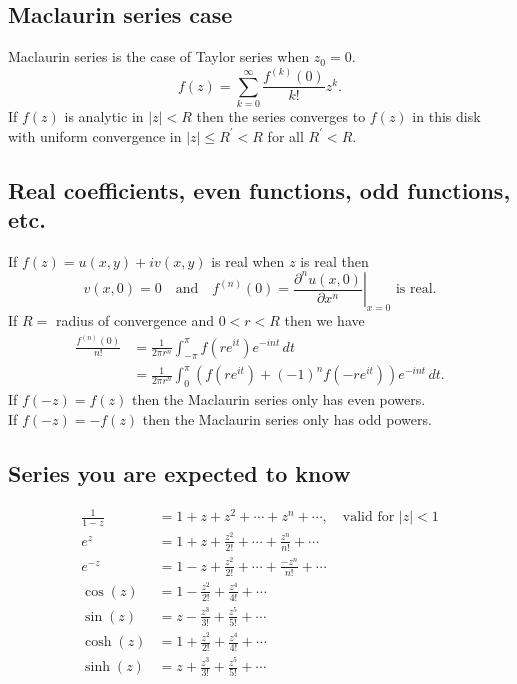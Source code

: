\documentclass{article}
\begin{document}
\subsection{Maclaurin series case}
Maclaurin series is the case of Taylor series when $z_0 = 0$.
\begin{equation}
    f(z) = \sum_{k=0}^\infty \frac{f^{(k)}(0)}{k!}z^k.
\end{equation}
If $f(z)$ is analytic in $\vert z\vert<R$ then the series converges to $f(z)$ in this disk with uniform convergence in $\vert z\vert\leq R^\prime<R$ for all $R^\prime<R$.

\subsection{Real coefficients, even functions, odd functions, etc.}
If $f(z) = u(x,y) + iv(x,y)$ is real when $z$ is real then
\begin{equation}
    v(x,0) = 0\quad\text{and}\quad f^{(n)}(0) = \left. \frac{\partial^n u(x,0)}{\partial x^n}\right\vert_{x=0}\text{ is real}.
\end{equation}
If $R =$ radius of convergence and $0<r<R$ then we have
\begin{align}
    \frac{f^{(n)}(0)}{n!} &= \frac{1}{2\pi r^n}\int_{-\pi}^{\pi}f(re^{it})e^{-int}\, dt \\
    &= \frac{1}{2\pi r^n}\int_{0}^{\pi}(f(re^{it}) + (-1)^n f(-re^{it}))e^{-int}\, dt.
\end{align}
If $f(-z)=f(z)$ then the Maclaurin series only has even powers.\\
If $f(-z) = -f(z)$ then the Maclaurin series only has odd powers.


\subsection{Series you are expected to know}
\begin{align}
    \frac{1}{1-z} &= 1 + z + z^2 + \cdots + z^n + \cdots, \quad\text{valid for }\vert z\vert<1 \\
    e^z &= 1 + z + \frac{z^2}{2!} + \cdots + \frac{z^n}{n!} + \cdots \\
    e ^{-z} &= 1 - z + \frac{z^2}{2!} + \cdots + \frac{-z^n}{n!} + \cdots \\
    \cos{(z)} &= 1 - \frac{z^2}{2!} + \frac{z^4}{4!} + \cdots \\
    \sin{(z)} &= z - \frac{z^3}{3!} + \frac{z^5}{5!} + \cdots \\
    \cosh{(z)} &= 1 + \frac{z^2}{2!} + \frac{z^4}{4!} + \cdots \\
    \sinh{(z)} &= z + \frac{z^3}{3!} + \frac{z^5}{5!} + \cdots \\
\end{align}
\end{document}
